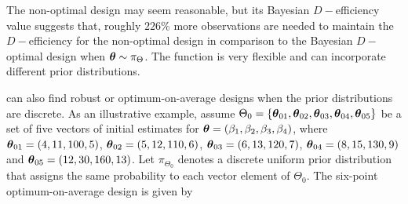 The non-optimal design may seem reasonable,  but its Bayesian $D-$efficiency value suggests that, roughly $226\%$ more observations are needed to maintain the $D-$efficiency for the non-optimal design in comparison to the Bayesian $D-$optimal design when
$\boldsymbol{\theta} \sim \pi_\Theta$. The  function  is very  flexible and  can incorporate different   prior distributions. %

 can also  find robust or optimum-on-average designs when the prior distributions  are  discrete. As an illustrative example,  assume $\Theta_0 = \{\boldsymbol{\theta}_{01}, \boldsymbol{\theta}_{02} , \boldsymbol{\theta}_{03} , \boldsymbol{\theta}_{04} , \boldsymbol{\theta}_{05}\}$ be a set of five vectors of  initial estimates  for $\boldsymbol{\theta} = (\beta_1, \beta_2,\beta_3, \beta_4)$, where  $\boldsymbol{\theta}_{01} = (4, 11, 100, 5)$, $ \boldsymbol{\theta}_{02} = (5, 12, 110, 6)$, $\boldsymbol{\theta}_{03} = (6, 13, 120, 7)$, $\boldsymbol{\theta}_{04} = (8, 15, 130, 9)$ and $\boldsymbol{\theta}_{05} = (12, 30, 160, 13)$. Let $\pi_{\Theta_0}$ denotes a discrete uniform  prior distribution that assigns the same probability to each vector element of  $\Theta_0$. The six-point optimum-on-average design is given by

